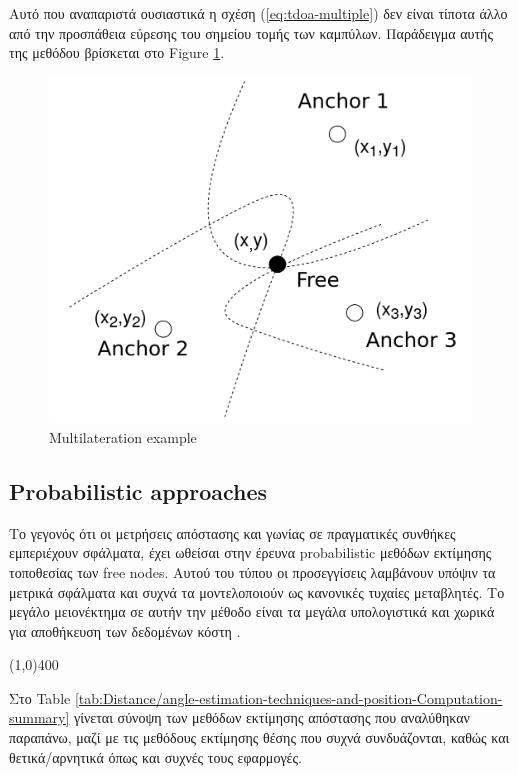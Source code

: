 Αυτό που αναπαριστά ουσιαστικά η σχέση (\ref{eq:tdoa-multiple}) δεν είναι τίποτα άλλο από την προσπάθεια εύρεσης του σημείου τομής των καμπύλων.
Παράδειγμα αυτής της μεθόδου βρίσκεται στο Figure \ref{fig:Multilateration}.

\begin{figure} [H]
	\centering
	\includegraphics[width=0.5\linewidth]{../Photos/multilateration.png}
	\decoRule
	\caption[Multilateration example]{Multilateration example}
	\label{fig:Multilateration}
\end{figure}


\subsection{Probabilistic approaches}
Το γεγονός ότι οι μετρήσεις απόστασης και γωνίας σε πραγματικές συνθήκες εμπεριέχουν σφάλματα, έχει ωθείσαι στην έρευνα 
probabilistic μεθόδων εκτίμησης τοποθεσίας των free nodes. Αυτού του τύπου οι προσεγγίσεις λαμβάνουν υπόψιν τα μετρικά σφάλματα και συχνά τα μοντελοποιούν ως κανονικές
τυχαίες μεταβλητές. Το μεγάλο μειονέκτημα σε αυτήν την μέθοδο είναι τα μεγάλα υπολογιστικά και χωρικά για αποθήκευση των δεδομένων κόστη \cite{wsn-Localization-systems}. 

\vspace{0.7\baselineskip}
\begin{center}
	\line(1,0){400}
\end{center}
\vspace{0.7\baselineskip}

Στο Table \ref{tab:Distance/angle-estimation-techniques-and-position-Computation-summary} γίνεται σύνοψη των μεθόδων εκτίμησης απόστασης
που αναλύθηκαν παραπάνω, μαζί με τις μεθόδους εκτίμησης θέσης που συχνά συνδυάζονται, καθώς και θετικά/αρνητικά όπως και συχνές τους εφαρμογές. 
 
